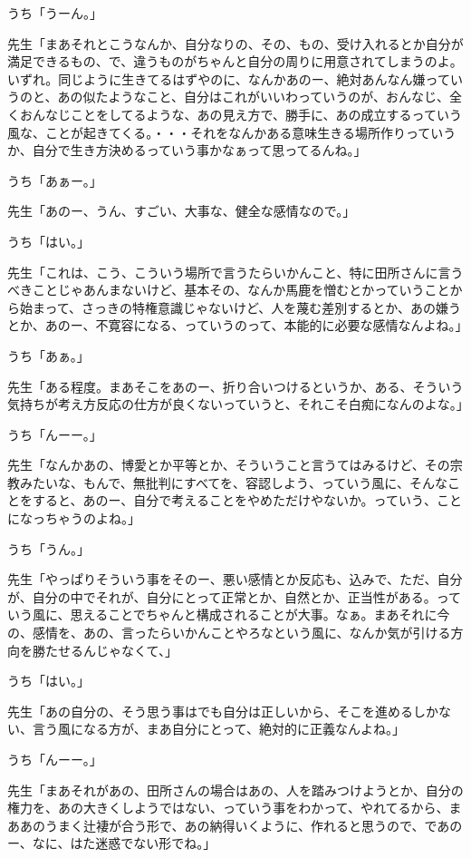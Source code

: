\documentclass[b5j,twoside,twocolumn]{utarticle}
\begin{document}
\begin{description}
\item うち「うーん。」
\item 先生「まあそれとこうなんか、自分なりの、その、もの、受け入れるとか自分が満足できるもの、で、違うものがちゃんと自分の周りに用意されてしまうのよ。いずれ。同じように生きてるはずやのに、なんかあのー、絶対あんなん嫌っていうのと、あの似たようなこと、自分はこれがいいわっていうのが、おんなじ、全くおんなじことをしてるような、あの見え方で、勝手に、あの成立するっていう風な、ことが起きてくる。・・・それをなんかある意味生きる場所作りっていうか、自分で生き方決めるっていう事かなぁって思ってるんね。」
\item うち「あぁー。」
\item 先生「あのー、うん、すごい、大事な、健全な感情なので。」
\item うち「はい。」
\item 先生「これは、こう、こういう場所で言うたらいかんこと、特に田所さんに言うべきことじゃあんまないけど、基本その、なんか馬鹿を憎むとかっていうことから始まって、さっきの特権意識じゃないけど、人を蔑む差別するとか、あの嫌うとか、あのー、不寛容になる、っていうのって、本能的に必要な感情なんよね。」
\item うち「あぁ。」
\item 先生「ある程度。まあそこをあのー、折り合いつけるというか、ある、そういう気持ちが考え方反応の仕方が良くないっていうと、それこそ白痴になんのよな。」
\item うち「んーー。」
\item 先生「なんかあの、博愛とか平等とか、そういうこと言うてはみるけど、その宗教みたいな、もんで、無批判にすべてを、容認しよう、っていう風に、そんなことをすると、あのー、自分で考えることをやめただけやないか。っていう、ことになっちゃうのよね。」
\item うち「うん。」
\item 先生「やっぱりそういう事をそのー、悪い感情とか反応も、込みで、ただ、自分が、自分の中でそれが、自分にとって正常とか、自然とか、正当性がある。っていう風に、思えることでちゃんと構成されることが大事。なぁ。まあそれに今の、感情を、あの、言ったらいかんことやろなという風に、なんか気が引ける方向を勝たせるんじゃなくて、」
\item うち「はい。」
\item 先生「あの自分の、そう思う事はでも自分は正しいから、そこを進めるしかない、言う風になる方が、まあ自分にとって、絶対的に正義なんよね。」
\item うち「んーー。」
\item 先生「まあそれがあの、田所さんの場合はあの、人を踏みつけようとか、自分の権力を、あの大きくしようではない、っていう事をわかって、やれてるから、まああのうまく辻褄が合う形で、あの納得いくように、作れると思うので、であのー、なに、はた迷惑でない形でね。」

\end{description}
\end{document}
